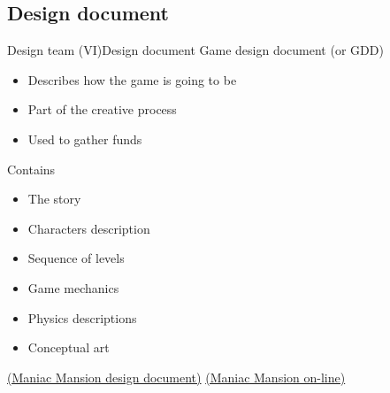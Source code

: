 \documentclass[10pt,compress]{beamer} %
\begin{document}
\subsection{Design document}
\begin{frame}{Design team (VI)}{Design document}
	Game design document (or \alert{GDD})
	\begin{itemize}
		\item Describes how the game is going to be
		\item Part of the creative process
		\item Used to gather funds
	\end{itemize}
	Contains
	\begin{itemize}
		\item The story
		\item Characters description
		\item Sequence of levels
		\item Game mechanics 
		\item Physics descriptions
		\item Conceptual art
	\end{itemize}
	\href{http://grumpygamer.com/maniac_mansion_design_doc}{(Maniac Mansion design document)} \href{http://playdosgamesonline.com/maniac-mansion.html}{(Maniac Mansion on-line)}
\end{frame}
\end{document}
